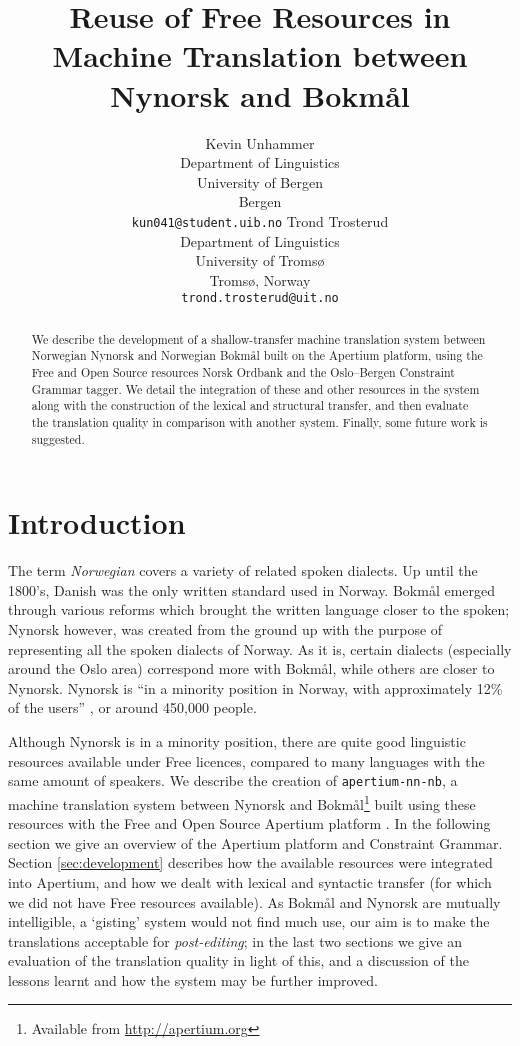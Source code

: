 \documentclass[11pt]{article}
\author{Kevin Unhammer\\  Department of Linguistics \\ University of Bergen \\  Bergen \\  {\tt  kun041@student.uib.no} \And  Trond Trosterud \\  Department of Linguistics \\  University of Tromsø \\  Tromsø, Norway \\    {\tt trond.trosterud@uit.no}}
\title{Reuse of Free Resources in Machine Translation between Nynorsk and Bokmål}
\begin{document}
\maketitle

  \begin{abstract}
    We describe the development of a shallow-transfer machine
    translation system between Norwegian Nynorsk and Norwegian Bokmål
    built on the Apertium platform, using the Free and Open Source
    resources Norsk Ordbank and the Oslo–Bergen Constraint Grammar
    tagger. We detail the integration of these and other resources in
    the system along with the construction of the lexical and
    structural transfer, and then evaluate the translation quality in
    comparison with another system. Finally, some future work is
    suggested.
  \end{abstract}

\section{Introduction}
The term \emph{Norwegian} covers a variety of related spoken dialects.
Up until the 1800's, Danish was the only written standard used in
Norway. Bokmål emerged through various reforms which brought the
written language closer to the spoken; Nynorsk however, was created
from the ground up with the purpose of representing all the spoken
dialects of Norway. As it is, certain dialects (especially around the
Oslo area) correspond more with Bokmål, while others are closer to
Nynorsk. Nynorsk is ``in a minority position in Norway, with
approximately 12\% of the users'' \citep{everson2000sln}, or around
450,000 people.

Although Nynorsk is in a minority position, there are quite good
linguistic resources available under Free licences, compared to many
languages with the same amount of speakers. We describe the creation
of {\tt apertium-nn-nb}, a machine translation system between Nynorsk
and Bokmål\footnote{Available from
  \href{http://apertium.org}{http://apertium.org} } built using these
resources with the Free and Open Source Apertium platform
\citep{corbi05oss}. In the following section we give an overview of
the Apertium platform and Constraint Grammar. Section
\ref{sec:development} describes how the available resources were
integrated into Apertium, and how we dealt with lexical and syntactic
transfer (for which we did not have Free resources available). As
Bokmål and Nynorsk are mutually intelligible, a `gisting' system would
not find much use, our aim is to make the translations acceptable for
\emph{post-editing}; in the last two sections we give an evaluation of
the translation quality in light of this, and a discussion of the
lessons learnt and how the system may be further improved.
\end{document}

